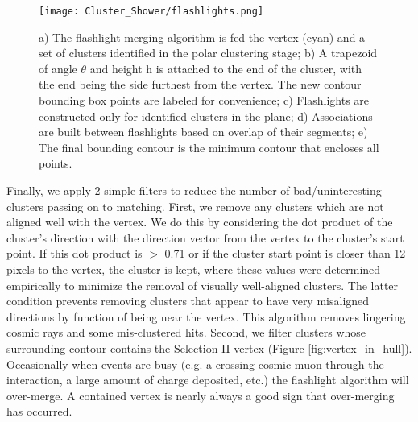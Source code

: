 \documentclass{article}
\begin{document}
\begin{figure}[h!]
\centering
\texttt{[image: Cluster\_Shower/flashlights.png]}
\caption{ a) The flashlight merging algorithm is fed the vertex (cyan) and a set of clusters identified in the polar clustering stage; b) A trapezoid of angle $\theta$ and height h is attached to the end of the cluster, with the end being the side furthest from the vertex.  The new contour bounding box points are labeled for convenience; c) Flashlights are constructed only for identified clusters in the plane; d) Associations are built between flashlights based on overlap of their segments; e) The final bounding contour is the minimum contour that encloses all points.  }
\label{fig:misc_flashlights}
\end{figure}




\par Finally, we apply 2 simple filters to reduce the number of bad/uninteresting clusters passing on to matching. First, we remove any clusters which are not aligned well with the vertex.  We do this by considering the dot product of the cluster's direction with the direction vector from the vertex to the cluster's start point.  If this dot product is $>$ 0.71 or if the cluster start point is closer than 12 pixels to the vertex, the cluster is kept, where these values were determined empirically to minimize the removal of visually well-aligned clusters.  The latter condition prevents removing clusters that appear to have very misaligned directions by function of being near the vertex. This algorithm removes lingering cosmic rays and some mis-clustered hits. Second, we filter clusters whose surrounding contour contains the Selection II vertex (Figure \ref{fig:vertex_in_hull}). Occasionally when events are busy (e.g. a crossing cosmic muon through the interaction, a large amount of charge deposited, etc.) the flashlight algorithm will over-merge. A contained vertex is nearly always a good sign that over-merging has occurred.  
\end{document}

